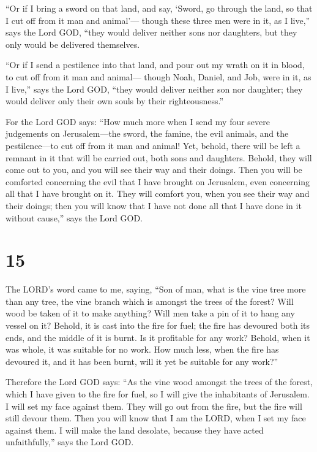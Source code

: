  ``Or if I bring a sword on that land, and say, `Sword, go
through the land, so that I cut off from it man and animal'---
 though these three men were in it, as I live,'' says the
Lord GOD, ``they would deliver neither sons nor daughters, but they only
would be delivered themselves.

 ``Or if I send a pestilence into that land, and pour out
my wrath on it in blood, to cut off from it man and animal---
 though Noah, Daniel, and Job, were in it, as I live,''
says the Lord GOD, ``they would deliver neither son nor daughter; they
would deliver only their own souls by their righteousness.''

 For the Lord GOD says: ``How much more when I send my four
severe judgements on Jerusalem---the sword, the famine, the evil
animals, and the pestilence---to cut off from it man and animal!
 Yet, behold, there will be left a remnant in it that will
be carried out, both sons and daughters. Behold, they will come out to
you, and you will see their way and their doings. Then you will be
comforted concerning the evil that I have brought on Jerusalem, even
concerning all that I have brought on it.  They will
comfort you, when you see their way and their doings; then you will know
that I have not done all that I have done in it without cause,'' says
the Lord GOD.

\hypertarget{section-13}{%
\section{15}\label{section-13}}

 The LORD's word came to me, saying,  ``Son of
man, what is the vine tree more than any tree, the vine branch which is
amongst the trees of the forest?  Will wood be taken of it
to make anything? Will men take a pin of it to hang any vessel on it?
 Behold, it is cast into the fire for fuel; the fire has
devoured both its ends, and the middle of it is burnt. Is it profitable
for any work?  Behold, when it was whole, it was suitable
for no work. How much less, when the fire has devoured it, and it has
been burnt, will it yet be suitable for any work?''

 Therefore the Lord GOD says: ``As the vine wood amongst the
trees of the forest, which I have given to the fire for fuel, so I will
give the inhabitants of Jerusalem.  I will set my face
against them. They will go out from the fire, but the fire will still
devour them. Then you will know that I am the LORD, when I set my face
against them.  I will make the land desolate, because they
have acted unfaithfully,'' says the Lord GOD.


